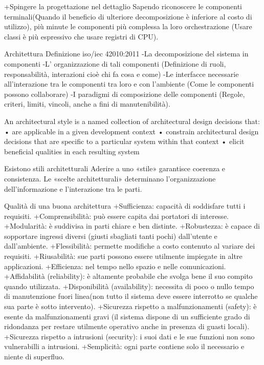 \documentclass{report}
\begin{document}
+Spingere la progettazione nel dettaglio
Sapendo riconoscere le componenti terminali(Quando il beneficio di ulteriore decomposizione è inferiore al costo di utilizzo), più minute le componenti più complessa la loro orchestrazione (Usare classi è più espressivo che usare registri di CPU).

Architettura Definizione iso/iec 42010:2011
-La decomposizione del sistema in componenti
-L’ organizzazione di tali componenti (Definizione di ruoli, responsabilità, interazioni cioè chi fa cosa e come)
-Le interfacce necessarie all’interazione tra le componenti tra loro e con l’ambiente (Come le componenti possono collaborare)
-I paradigmi di composizione delle componenti (Regole, criteri, limiti, vincoli, anche a fini di manutenibilità).

An architectural style is a named collection of architectural design decisions that:
• are applicable in a given development context
• constrain architectural design decisions that are specific to a particular system within that context
• elicit beneficial qualities in each resulting system

Esistono stili architetturali
Aderire a uno «stile» garantisce coerenza e consistenza.
Le «scelte architetturali» determinano l’organizzazione dell’informazione e l’interazione tra le parti.

Qualità di una buona architettura
+Sufficienza: capacità di soddisfare tutti i requisiti.
+Comprensibilità: può essere capita dai portatori di interesse.
+Modularità: è suddivisa in parti chiare e ben distinte.
+Robustezza: è capace di sopportare ingressi diversi (giusti sbagliati tanti pochi) dall'utente e dall'ambiente.
+Flessibilità: permette modifiche a costo contenuto al variare dei requisiti.
+Riusabilità: sue parti possono essere utilmente impiegate in altre applicazioni.
+Efficienza: nel tempo nello spazio e nelle comunicazioni.
+Affidabilità (reliability):  è altamente probabile che svolga bene il suo compito quando utilizzata.
+Disponibilità (availability): necessita di poco o nullo tempo di manutenzione fuori linea(non tutto il sistema deve essere interrotto se qualche sua parte è sotto intervento).
+Sicurezza rispetto a malfunzionamenti (safety): è esente da malfunzionamenti gravi (il sistema dispone di un sufficiente grado di ridondanza per restare utilmente operativo anche in presenza di guasti locali).
+Sicurezza rispetto a intrusioni (security): i suoi dati e le sue funzioni non sono vulnerabilli a intrusioni.
+Semplicità: ogni parte contiene solo il necessario e niente di superfluo.
\end{document}
